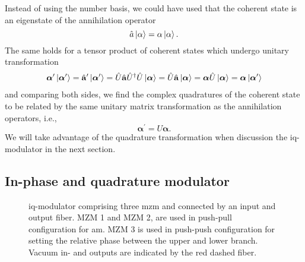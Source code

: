 Instead of using the number basis, we could have used that the coherent state is an eigenstate of the annihilation operator
\begin{equation}
	\hat{a}
	\ket{\alpha}
	=
	\alpha
	\ket{\alpha}
	.
\end{equation}
The same holds for a tensor product of coherent states which undergo unitary transformation
\begin{equation}
	\begin{split}
		\boldsymbol{\alpha}^\prime
		\ket{\boldsymbol{\alpha}^\prime}
		=
		\hat{\vb{a}}^\prime
		\ket{\boldsymbol{\alpha}^\prime}
		=
		\hat{U}
		\hat{\vb{a}}
		\hat{U}^\dagger
		\hat{U}
		\ket{\boldsymbol{\alpha}}
		=
		\hat{U}
		\hat{\vb{a}}
		\ket{\boldsymbol{\alpha}}
		=
		\boldsymbol{\alpha}
		\hat{U}
		\ket{\boldsymbol{\alpha}}
		=
		\boldsymbol{\alpha}
		\ket{\boldsymbol{\alpha}^\prime}
	\end{split}
\end{equation}
and comparing both sides, we find the complex quadratures of the coherent state to be related by the same unitary matrix transformation as the annihilation operators, i.e.,
\begin{equation}
	\boldsymbol{\alpha}^\prime
	=
	U
	\boldsymbol{\alpha}
	.
\end{equation}
We will take advantage of the quadrature transformation when discussion the \gls{iq}-modulator in the next section.

\subsection{In-phase and quadrature modulator}

\begin{figure}[htb]
	\centering
	
	\caption{\gls{iq}-modulator comprising three \gls{mzm} and connected by an input and output fiber. MZM 1 and MZM 2, are used in push-pull configuration for \gls{am}. MZM 3 is used in push-push configuration for setting the relative phase between the upper and lower branch. Vacuum in- and outputs are indicated by the red dashed fiber.}
\end{figure}

